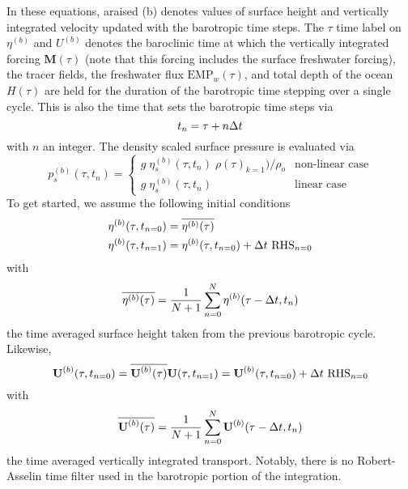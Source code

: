 \documentclass[../tex_main/NEMO_manual]{subfiles}
\begin{document}
{In these equations, araised (b) denotes values of surface height and vertically integrated velocity updated with the barotropic time steps. The $\tau$ time label on $\eta^{(b)}$ 
and $U^{(b)}$ denotes the baroclinic time at which the vertically integrated forcing $\textbf{M}(\tau)$ (note that this forcing includes the surface freshwater forcing), the tracer fields, the freshwater flux $\text{EMP}_w(\tau)$, and total depth of the ocean $H(\tau)$ are held for the duration of the barotropic time stepping over a single cycle. This is also the time 
that sets the barotropic time steps via 
\begin{equation} \label{eq:DYN_spg_ts_t}
t_n=\tau+n\Delta t   
\end{equation}
with $n$ an integer. The density scaled surface pressure is evaluated via 
\begin{equation} \label{eq:DYN_spg_ts_ps}
p_s^{(b)}(\tau,t_{n}) = \begin{cases}
	g \;\eta_s^{(b)}(\tau,t_{n}) \;\rho(\tau)_{k=1}) / \rho_o  &      \text{non-linear case} \\
	g \;\eta_s^{(b)}(\tau,t_{n})  &      \text{linear case} 
	\end{cases}
\end{equation}
To get started, we assume the following initial conditions 
\begin{equation} \label{eq:DYN_spg_ts_eta}
\begin{split}
\eta^{(b)}(\tau,t_{n=0}) &= \overline{\eta^{(b)}(\tau)}
\\
\eta^{(b)}(\tau,t_{n=1}) &= \eta^{(b)}(\tau,t_{n=0}) + \rdt \ \text{RHS}_{n=0} 
\end{split}
\end{equation}
with 
\begin{equation} \label{eq:DYN_spg_ts_etaF}
 \overline{\eta^{(b)}(\tau)} = \frac{1}{N+1} \sum\limits_{n=0}^N \eta^{(b)}(\tau-\Delta t,t_{n})
\end{equation}
the time averaged surface height taken from the previous barotropic cycle. Likewise, 
\begin{equation} \label{eq:DYN_spg_ts_u}
\textbf{U}^{(b)}(\tau,t_{n=0}) = \overline{\textbf{U}^{(b)}(\tau)}	\\
\\
\textbf{U}(\tau,t_{n=1}) = \textbf{U}^{(b)}(\tau,t_{n=0}) + \rdt \ \text{RHS}_{n=0}  	
\end{equation}
with 
\begin{equation} \label{eq:DYN_spg_ts_u}
 \overline{\textbf{U}^{(b)}(\tau)} 
 	= \frac{1}{N+1} \sum\limits_{n=0}^N\textbf{U}^{(b)}(\tau-\Delta t,t_{n})
\end{equation}
the time averaged vertically integrated transport. Notably, there is no Robert-Asselin time filter used in the barotropic portion of the integration. 

}
\end{document}
